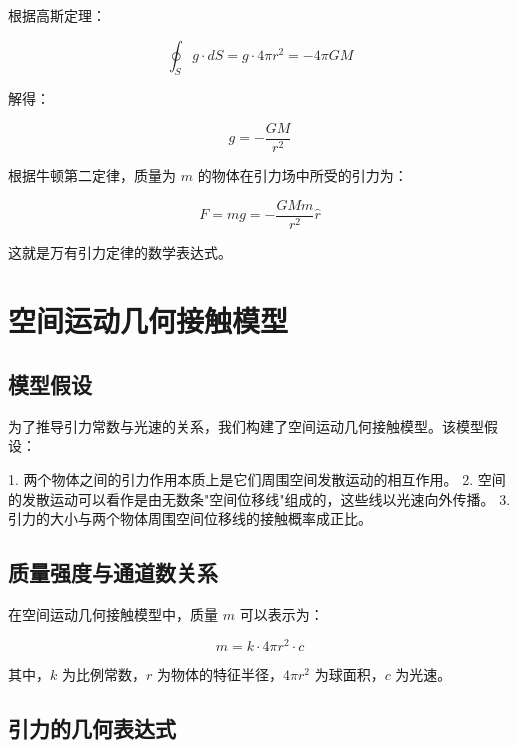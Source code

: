\documentclass[12pt,a4paper]{article}
\begin{document}
根据高斯定理：

\begin{equation}
\oint_S g \cdot dS = g \cdot 4\pi r^2 = -4\pi G M
\label{eq:gauss_sphere}
\end{equation}

解得：

\begin{equation}
g = -\frac{G M}{r^2}
\label{eq:gravitational_field_solution}
\end{equation}

根据牛顿第二定律，质量为 $m$ 的物体在引力场中所受的引力为：

\begin{equation}
F = m g = -\frac{G M m}{r^2} \hat{r}
\label{eq:newton_law}
\end{equation}

这就是万有引力定律的数学表达式。

\section{空间运动几何接触模型}
\label{section:space_motion_contact_model}

\subsection{模型假设}
\label{subsection:model_assumptions}

为了推导引力常数与光速的关系，我们构建了空间运动几何接触模型。该模型假设：

1. 两个物体之间的引力作用本质上是它们周围空间发散运动的相互作用。
2. 空间的发散运动可以看作是由无数条"空间位移线"组成的，这些线以光速向外传播。
3. 引力的大小与两个物体周围空间位移线的接触概率成正比。

\subsection{质量强度与通道数关系}
\label{subsection:mass_intensity}

在空间运动几何接触模型中，质量 $m$ 可以表示为：

\begin{equation}
m = k \cdot 4\pi r^2 \cdot c
\label{eq:mass_intensity}
\end{equation}

其中，$k$ 为比例常数，$r$ 为物体的特征半径，$4\pi r^2$ 为球面积，$c$ 为光速。

\subsection{引力的几何表达式}
\label{subsection:gravitational_geometric_expression}
\end{document}

